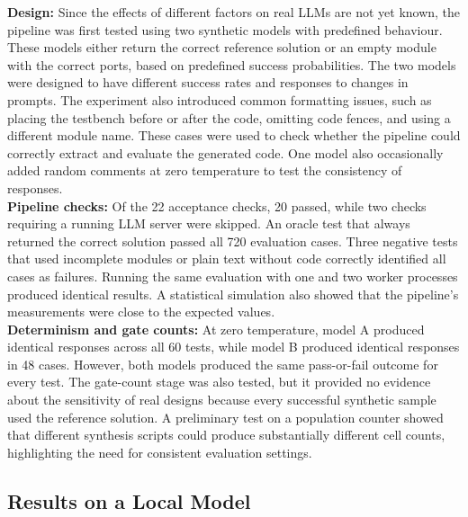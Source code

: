 \documentclass[conference]{IEEEtran}
\begin{document}
\noindent \textbf{Design:} Since the effects of different factors on real LLMs are not yet known, the pipeline was first tested using two synthetic models with predefined behaviour. These models either return the correct reference solution or an empty module with the correct ports, based on predefined success probabilities. The two models were designed to have different success rates and responses to changes in prompts. The experiment also introduced common formatting issues, such as placing the testbench before or after the code, omitting code fences, and using a different module name. These cases were used to check whether the pipeline could correctly extract and evaluate the generated code. One model also occasionally added random comments at zero temperature to test the consistency of responses.\\

\noindent \textbf{Pipeline checks:} Of the 22 acceptance checks, 20 passed, while two checks requiring a running LLM server were skipped. An oracle test that always returned the correct solution passed all 720 evaluation cases. Three negative tests that used incomplete modules or plain text without code correctly identified all cases as failures. Running the same evaluation with one and two worker processes produced identical results. A statistical simulation also showed that the pipeline's measurements were close to the expected values.\\

\noindent \textbf{Determinism and gate counts:} At zero temperature, model A produced identical responses across all 60 tests, while model B produced identical responses in 48 cases. However, both models produced the same pass-or-fail outcome for every test. The gate-count stage was also tested, but it provided no evidence about the sensitivity of real designs because every successful synthetic sample used the reference solution. A preliminary test on a population counter showed that different synthesis scripts could produce substantially different cell counts, highlighting the need for consistent evaluation settings.

\subsection{Results on a Local Model}\label{sec_m_status}
\end{document}
